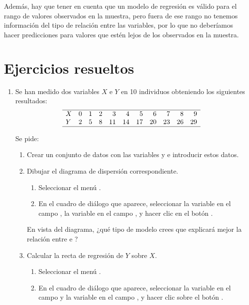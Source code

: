 Además, hay que tener en cuenta que un modelo de regresión es válido para el rango de valores observados en la muestra,
pero fuera de ese rango no tenemos información del tipo de relación entre las variables, por lo que no deberíamos hacer
predicciones para valores que estén lejos de los observados en la muestra.

\clearpage
\newpage



\section{Ejercicios resueltos}
\begin{enumerate}[leftmargin=*]
\item Se han medido dos variables $X$ e $Y$ en 10 individuos obteniendo los siguientes resultados:
\[
\begin{array}{lrrrrrrrrrr}
\hline
X & 0 & 1 & 2 & 3 & 4 & 5 & 6 & 7 & 8 & 9 \\
Y & 2 & 5 & 8 & 11 & 14 & 17 & 20 & 23 & 26 & 29\\
\hline
\end{array}
\]

Se pide:

\begin{enumerate}
\item  Crear un conjunto de datos con las variables  y  e introducir estos datos.
\item  Dibujar el diagrama de dispersión correspondiente.
\begin{indicacion}
\begin{enumerate}
\item Seleccionar el menú .
\item En el cuadro de diálogo que aparece, seleccionar la variable  en el campo , la
variable  en el campo , y hacer clic en el botón .
\end{enumerate}
\end{indicacion}

En vista del diagrama, ¿qué tipo de modelo crees que explicará mejor la relación entre  e ?

\item Calcular la recta de regresión de $Y$ sobre $X$.
\begin{indicacion}
\begin{enumerate}
\item Seleccionar el menú .
\item En el cuadro de diálogo que aparece, seleccionar la variable  en el campo  y la variable  en el campo , y hacer clic sobre el botón
.
\end{enumerate}
\end{indicacion}


\end{enumerate}
\end{enumerate}
